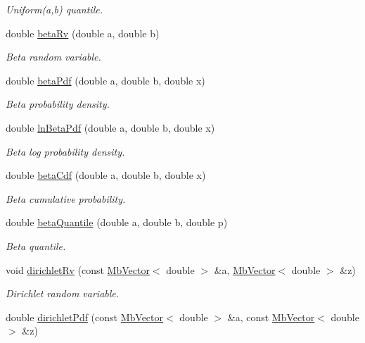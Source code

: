\begin{DoxyCompactItemize}
\begin{DoxyCompactList}\small\item\em Uniform(a,b) quantile. \end{DoxyCompactList}\item 
double \mbox{\hyperlink{class_mb_random_a254ae9c1ddbb886ff8dba78eac35e3ee}{beta\+Rv}} (double a, double b)
\begin{DoxyCompactList}\small\item\em Beta random variable. \end{DoxyCompactList}\item 
double \mbox{\hyperlink{class_mb_random_a5a2eb3c7ef62e1a6e537d1b530070de5}{beta\+Pdf}} (double a, double b, double x)
\begin{DoxyCompactList}\small\item\em Beta probability density. \end{DoxyCompactList}\item 
double \mbox{\hyperlink{class_mb_random_a19fb90a7e1297c3e0e0227e52d678f9f}{ln\+Beta\+Pdf}} (double a, double b, double x)
\begin{DoxyCompactList}\small\item\em Beta log probability density. \end{DoxyCompactList}\item 
double \mbox{\hyperlink{class_mb_random_a25c29accd700da05a331f46a4151d6ce}{beta\+Cdf}} (double a, double b, double x)
\begin{DoxyCompactList}\small\item\em Beta cumulative probability. \end{DoxyCompactList}\item 
double \mbox{\hyperlink{class_mb_random_a09212ae872506d80046e9be639591248}{beta\+Quantile}} (double a, double b, double p)
\begin{DoxyCompactList}\small\item\em Beta quantile. \end{DoxyCompactList}\item 
void \mbox{\hyperlink{class_mb_random_a349f74622dd56fd83fbab97399fc0ce0}{dirichlet\+Rv}} (const \mbox{\hyperlink{class_mb_vector}{Mb\+Vector}}$<$ double $>$ \&a, \mbox{\hyperlink{class_mb_vector}{Mb\+Vector}}$<$ double $>$ \&z)
\begin{DoxyCompactList}\small\item\em Dirichlet random variable. \end{DoxyCompactList}\item 
double \mbox{\hyperlink{class_mb_random_ac784a996ea66522ed1ef83c699284e12}{dirichlet\+Pdf}} (const \mbox{\hyperlink{class_mb_vector}{Mb\+Vector}}$<$ double $>$ \&a, const \mbox{\hyperlink{class_mb_vector}{Mb\+Vector}}$<$ double $>$ \&z)

\end{DoxyCompactItemize}
